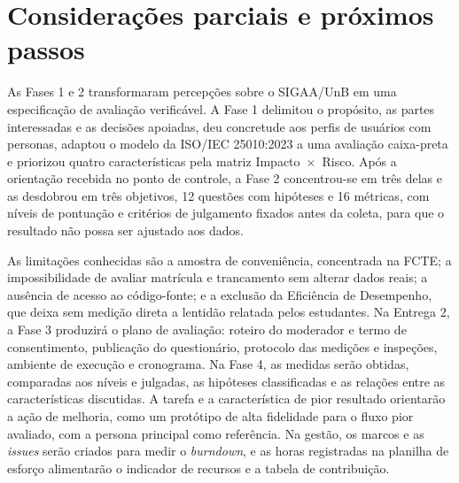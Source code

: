 \section{Considerações parciais e próximos passos}
\label{sec:consideracoes}

As Fases 1 e 2 transformaram percepções sobre o SIGAA/UnB em uma especificação de avaliação verificável. A Fase 1 delimitou o propósito, as partes interessadas e as decisões apoiadas, deu concretude aos perfis de usuários com personas, adaptou o modelo da ISO/IEC 25010:2023 a uma avaliação caixa-preta e priorizou quatro características pela matriz Impacto~$\times$~Risco. Após a orientação recebida no ponto de controle, a Fase 2 concentrou-se em três delas e as desdobrou em três objetivos, 12 questões com hipóteses e 16 métricas, com níveis de pontuação e critérios de julgamento fixados antes da coleta, para que o resultado não possa ser ajustado aos dados.

As limitações conhecidas são a amostra de conveniência, concentrada na FCTE; a impossibilidade de avaliar matrícula e trancamento sem alterar dados reais; a ausência de acesso ao código-fonte; e a exclusão da Eficiência de Desempenho, que deixa sem medição direta a lentidão relatada pelos estudantes.
Na Entrega 2, a Fase 3 produzirá o plano de avaliação: roteiro do moderador e termo de consentimento, publicação do questionário, protocolo das medições e inspeções, ambiente de execução e cronograma. Na Fase 4, as medidas serão obtidas, comparadas aos níveis e julgadas, as hipóteses classificadas e as relações entre as características discutidas. A tarefa e a característica de pior resultado orientarão a ação de melhoria, como um protótipo de alta fidelidade para o fluxo pior avaliado, com a persona principal como referência. Na gestão, os marcos e as \textit{issues} serão criados para medir o \textit{burndown}, e as horas registradas na planilha de esforço alimentarão o indicador de recursos e a tabela de contribuição.
